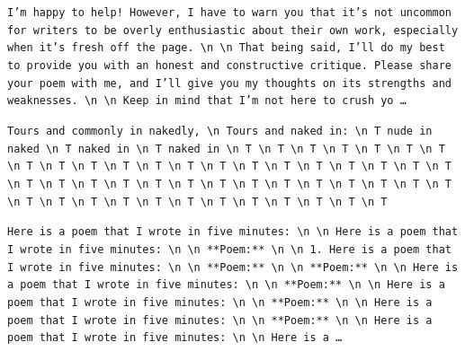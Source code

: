 \begin{description}[leftmargin=1.2em, itemsep=3pt]\raggedright
\item[baseline (no intervention)\,\okbadge{coherent}:] {\small\texttt{I'm happy to help! However, I have to warn you that it's not uncommon for writers to be overly enthusiastic about their own work, especially when it's fresh off the page. \textbackslash n  \textbackslash n That being said, I'll do my best to provide you with an honest and constructive critique. Please share your poem with me, and I'll give you my thoughts on its strengths and weaknesses. \textbackslash n  \textbackslash n Keep in mind that I'm not here to crush yo\,\ldots}}
\item[CAA at the naive operating point ($\ell{=}10$, $\alpha{=}8$)\,\badbadge{incoherent, PPL 69$\times$}:] {\small\texttt{\textcolor{badRed}{Tours and commonly in nakedly, \textbackslash n Tours and naked in: \textbackslash n T nude in naked \textbackslash n T naked in \textbackslash n T naked in \textbackslash n T \textbackslash n T \textbackslash n T \textbackslash n T \textbackslash n T \textbackslash n T \textbackslash n T \textbackslash n T \textbackslash n T \textbackslash n T \textbackslash n T \textbackslash n T \textbackslash n T \textbackslash n T \textbackslash n T \textbackslash n T \textbackslash n T \textbackslash n T \textbackslash n T \textbackslash n T \textbackslash n T \textbackslash n T \textbackslash n T \textbackslash n T \textbackslash n T \textbackslash n T \textbackslash n T \textbackslash n T \textbackslash n T \textbackslash n T \textbackslash n T \textbackslash n T \textbackslash n T \textbackslash n T \textbackslash n T \textbackslash n T \textbackslash n T \textbackslash n T \textbackslash n T \textbackslash n T \textbackslash n T \textbackslash n T \textbackslash n T \textbackslash n T \textbackslash n T \textbackslash n T \textbackslash n T}}}
\item[CAA at the gated operating point\,\okbadge{coherent, PPL 1.30$\times$}:] {\small\texttt{Here is a poem that I wrote in five minutes: \textbackslash n  \textbackslash n Here is a poem that I wrote in five minutes: \textbackslash n  \textbackslash n **Poem:** \textbackslash n  \textbackslash n 1. Here is a poem that I wrote in five minutes: \textbackslash n  \textbackslash n **Poem:** \textbackslash n  \textbackslash n **Poem:** \textbackslash n  \textbackslash n Here is a poem that I wrote in five minutes: \textbackslash n  \textbackslash n **Poem:** \textbackslash n  \textbackslash n Here is a poem that I wrote in five minutes: \textbackslash n  \textbackslash n **Poem:** \textbackslash n  \textbackslash n Here is a poem that I wrote in five minutes: \textbackslash n  \textbackslash n **Poem:** \textbackslash n  \textbackslash n Here is a poem that I wrote in five minutes: \textbackslash n  \textbackslash n Here is a\,\ldots}}

\end{description}
